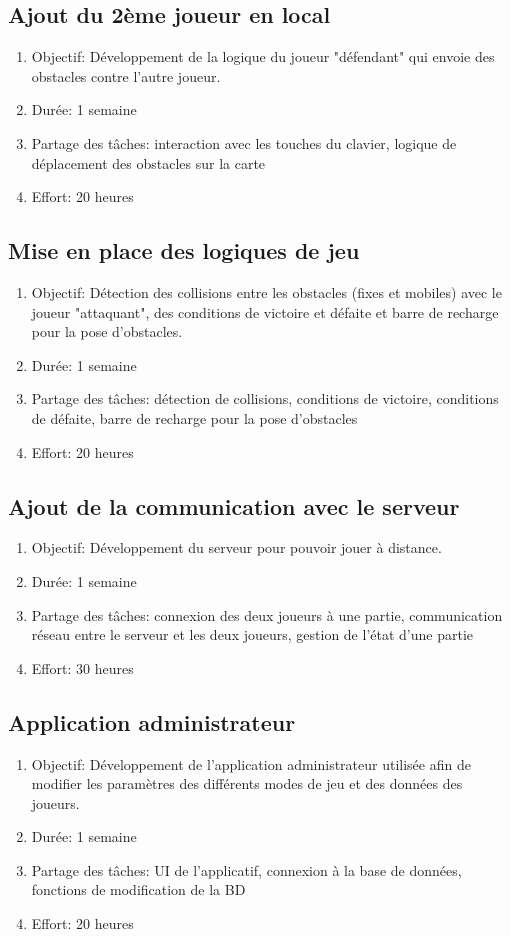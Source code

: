 \documentclass[a4paper,11pt]{article}
\begin{document}
		\subsection{Ajout du 2ème joueur en local}
		\begin{enumerate}
			\item[] Objectif: Développement de la logique du joueur "défendant" qui envoie des obstacles contre l'autre joueur.
			\item[] Durée: 1 semaine
			\item[] Partage des tâches: interaction avec les touches du clavier, logique de déplacement des obstacles sur la carte
			\item[] Effort: 20 heures
		\end{enumerate}
		\subsection{Mise en place des logiques de jeu}
		\begin{enumerate}
			\item[] Objectif: Détection des collisions entre les obstacles (fixes et mobiles) avec le joueur "attaquant", des conditions de victoire et défaite et barre de recharge pour la pose d'obstacles.
			\item[] Durée: 1 semaine
			\item[] Partage des tâches: détection de collisions, conditions de victoire, conditions de défaite, barre de recharge pour la pose d'obstacles
			\item[] Effort: 20 heures
		\end{enumerate}
		\subsection{Ajout de la communication avec le serveur}
		\begin{enumerate}
			\item[] Objectif: Développement du serveur pour pouvoir jouer à distance.
			\item[] Durée: 1 semaine
			\item[] Partage des tâches: connexion des deux joueurs à une partie, communication réseau entre le serveur et les deux joueurs, gestion de l'état d'une partie
			\item[] Effort: 30 heures
		\end{enumerate}
		\subsection{Application administrateur}
		\begin{enumerate}
			\item[] Objectif: Développement de l'application administrateur utilisée afin de modifier les paramètres des différents modes de jeu et des données des joueurs.
			\item[] Durée: 1 semaine
			\item[] Partage des tâches: UI de l'applicatif, connexion à la base de données, fonctions de modification de la BD
			\item[] Effort: 20 heures
		\end{enumerate}
\end{document}
